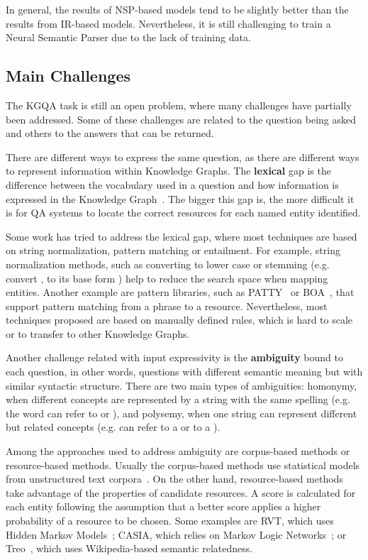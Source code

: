 In general, the results of NSP-based models tend to be slightly better than the results from 
IR-based models. Nevertheless, it is still challenging to train a Neural Semantic Parser due to 
the lack of training data.

\subsection{Main Challenges}
\label{cap2:theoFrame/qakg/challenges}
The KGQA task is still an open problem, where many challenges have partially been addressed. 
Some of these challenges are related to the question being asked and others to the answers that 
can be returned. 

There are different ways to express the same question, as there are different ways to represent 
information within Knowledge Graphs. The \textbf{lexical} gap is the difference between the 
vocabulary used in a question and how information is expressed in the Knowledge 
Graph~\cite{semPar:lexical-gap-HakimovUWC15}. The bigger this gap is, the more difficult it is 
for QA systems to locate the correct resources for each named entity identified. 

Some work has tried to address the lexical gap, where most techniques are based on string 
normalization, pattern matching or entailment. For example, string normalization methods, such 
as converting to lower case or stemming (e.g. convert , to its base form 
) help to reduce the search space when mapping entities. Another example are 
pattern libraries, such as PATTY~\cite{qa:NakasholeWS12} or BOA~\cite{qa:GerberN12}, that 
support pattern matching from a phrase to a resource. Nevertheless, most techniques proposed 
are based on manually defined rules, which is hard to scale or to transfer to other Knowledge 
Graphs.

Another challenge related with input expressivity is the \textbf{ambiguity} bound to each 
question, in other words, questions with different semantic meaning but with similar syntactic 
structure. There are two main types of ambiguities: homonymy, when different concepts are 
represented by a string with the same spelling (e.g. the word  can refer to 
 or ), and polysemy, when one string can 
represent different but related concepts (e.g.  can refer to a 
 or to a ). 

Among the approaches used to address ambiguity are corpus-based methods or resource-based 
methods. Usually the corpus-based methods use statistical models from unstructured text 
corpora~\cite{qa:shirai1997,qa:ShenYYJLC11}. On the other hand, resource-based methods take 
advantage of the \RDF{} properties of candidate resources. A score is calculated for each entity 
following the assumption that a better score applies a higher probability of a resource to be 
chosen. Some examples are RVT, which uses Hidden Markov Models~\cite{qa:GiannoneBB13}; CASIA, 
which relies on Markov Logic Networks~\cite{qa:shizhu2014casia}; or Treo~\cite{qa:freitas2011treo,
qa:FreitasOOSC13}, which uses Wikipedia-based semantic relatedness.

